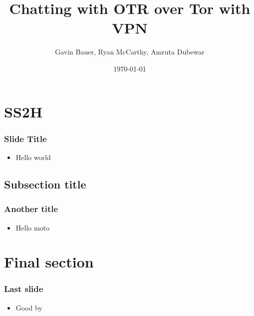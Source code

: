 \documentclass{beamer}
\title{Chatting with OTR over Tor with VPN}
\author{Gavin Bauer, Ryan McCarthy, Amruta Dubewar}
\date{\today}
\begin{document}
\begin{frame}
\maketitle
\end{frame}
\section{SS2H}
\begin{frame}
\frametitle{Slide Title}
\begin{itemize}
\item Hello world
\end{itemize}
\end{frame}
\subsection{Subsection title}
\begin{frame}
\frametitle{Another title}
\begin{itemize}
\item Hello moto
\end{itemize}
\end{frame}
\section{Final section}
\begin{frame}
\frametitle{Last slide}
\begin{itemize}
\item Good by
\end{itemize}
\end{frame}
\end{document}
